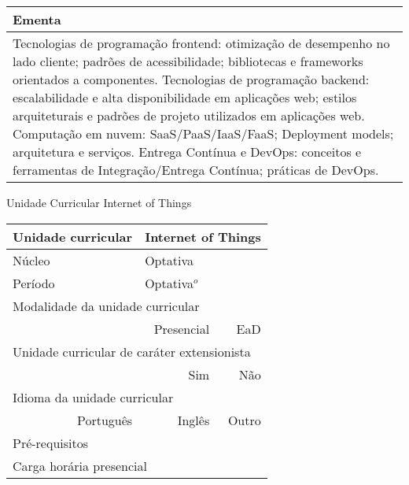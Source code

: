 \begin{quadro}[ht!]
\begin{tabular}{|p{3cm} p{2cm} p{3cm} p{2cm} p{3cm} p{2cm}|}
\multicolumn{6}{|p{15cm}|}{\cellcolor{blue1} Ementa} \\\hline
\hline\multicolumn{6}{|p{15cm}|}{\scriptsize Tecnologias de programação frontend: otimização de desempenho no lado cliente; padrões de acessibilidade; bibliotecas e frameworks orientados a componentes. Tecnologias de programação backend: escalabilidade e alta disponibilidade em aplicações web; estilos arquiteturais e padrões de projeto utilizados em aplicações web. Computação em nuvem: SaaS/PaaS/IaaS/FaaS; Deployment models; arquitetura e serviços. Entrega Contínua e DevOps: conceitos e ferramentas de Integração/Entrega Contínua; práticas de DevOps.}\\\hline 
\hline
	\end{tabular}
\end{quadro}


\begin{quadro}[ht!]
  \centering\scriptsize
\caption{Unidade Curricular Internet of Things}
\begin{tabular}{|p{3cm} p{2cm} p{3cm} p{2cm} p{3cm} p{2cm}|}\hline
\multicolumn{1}{|p{3cm}|}{\cellcolor{blue1} Unidade curricular} & \multicolumn{5}{p{9cm}|}{Internet of Things}\\\hline
\multicolumn{1}{|p{3cm}|}{\cellcolor{blue1} Núcleo} & \multicolumn{5}{p{11.5cm}|}{Optativa}\\\hline
\multicolumn{1}{|p{3cm}|}{\cellcolor{blue1} Período} & \multicolumn{5}{p{9cm}|}{Optativa$^o$}\\\hline
\multicolumn{6}{|p{15cm}|}{\cellcolor{blue1} Modalidade da unidade curricular} \\\hline
\multicolumn{2}{|r}{		} &  \multicolumn{2}{r}{Presencial \Square} & \multicolumn{2}{r|}{EaD \XBox	} \\\hline
\multicolumn{6}{|p{15cm}|}{\cellcolor{blue1} Unidade curricular de caráter extensionista} \\\hline
\multicolumn{4}{|r}{			Sim \XBox	} & \multicolumn{2}{r|}{	Não \Square	}\\\hline
\multicolumn{6}{|p{15cm}|}{\cellcolor{blue1} Idioma da unidade curricular} \\ \hline
\multicolumn{2}{|r}{	Português \XBox	} &  \multicolumn{2}{r}{	Inglês \Square	} & \multicolumn{2}{r|}{	Outro \Square	} \\ \hline
\multicolumn{1}{|p{3cm}|}{\cellcolor{blue1} Pré-requisitos} & \multicolumn{5}{p{9cm}|}{}\\ \hline
\multicolumn{6}{|p{15cm}|}{\cellcolor{blue1} Carga horária presencial} \\ \hline

\end{tabular}
\end{quadro}
